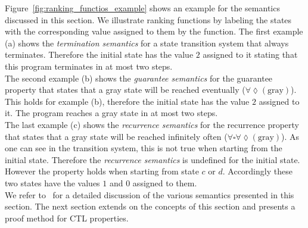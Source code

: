 \documentclass[11pt,a4paper,titlepage]{article}
\theoremstyle{definition}
\begin{document}
Figure~\ref{fig:ranking_functios_example} shows an example for the semantics discussed in this section.
We illustrate ranking functions by labeling the states with the corresponding value assigned to them by the function. 
The first example (a) shows the \textit{termination semantics} for a state transition system that always terminates. Therefore the initial state
has the value $2$ assigned to it stating that this program terminates in at most two steps.\\

The second example (b) shows the \textit{guarantee semantics} for the guarantee property that states that a gray state will be reached eventually 
($\forall\lozenge(\text{gray})$).
This holds for example (b), therefore the initial state has the value $2$ assigned to it. The program reaches a gray state in at most two steps.\\

The last example (c) shows the \textit{recurrence semantics} for the recurrence property that states that a gray state will be reached infinitely often
($\forall\square\forall\lozenge(\text{gray})$).
As one can see in the transition system, this is not true when starting from the initial state. Therefore the \textit{recurrence semantics} is undefined
for the initial state. However the property holds when starting from state $c$ or $d$. 
Accordingly these two states have the values $1$ and $0$ assigned to them.\\

We refer to~\cite{UrbanPhd} for a detailed discussion of the various semantics presented in this section.
The next section extends on the concepts of this section and presents a proof method for CTL properties.
\end{document}
